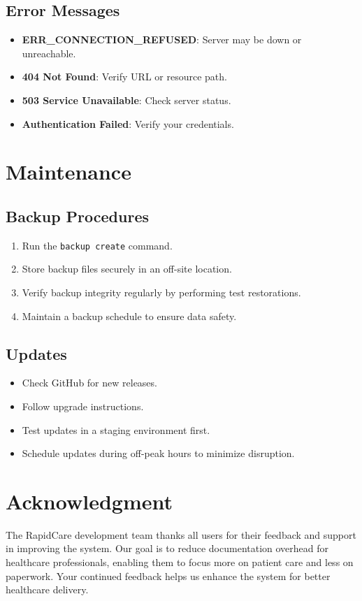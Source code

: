 \documentclass[12pt, titlepage]{article}
\begin{document}
\subsection{Error Messages}
\begin{itemize}
\item \textbf{ERR\_CONNECTION\_REFUSED}: Server may be down or unreachable.
\item \textbf{404 Not Found}: Verify URL or resource path.
\item \textbf{503 Service Unavailable}: Check server status.
\item \textbf{Authentication Failed}: Verify your credentials.
\end{itemize}

\section{Maintenance}
\subsection{Backup Procedures}
\begin{enumerate}
\item Run the \texttt{backup create} command.
\item Store backup files securely in an off-site location.
\item Verify backup integrity regularly by performing test restorations.
\item Maintain a backup schedule to ensure data safety.
\end{enumerate}

\subsection{Updates}
\begin{itemize}
\item Check GitHub for new releases.
\item Follow upgrade instructions.
\item Test updates in a staging environment first.
\item Schedule updates during off-peak hours to minimize disruption.
\end{itemize}

\section*{Acknowledgment}
The RapidCare development team thanks all users for their feedback and support in improving the system. Our goal is to reduce documentation overhead for healthcare professionals, enabling them to focus more on patient care and less on paperwork. Your continued feedback helps us enhance the system for better healthcare delivery.
\end{document}
